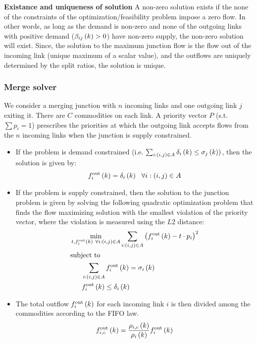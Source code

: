 \textbf{Existance and uniqueness of solution}
A non-zero solution exists if the none of the constraints of the optimization/feasibility problem impose a zero flow. In other words, as long as the demand is non-zero and none of the outgoing links with positive demand ($\aggsplitratio{i}{j}{k} > 0$) have non-zero supply, the non-zero solution will exist. Since, the solution to the maximum junction flow is the flow out of the incoming link (unique maximum of a scalar value), and the outflows are uniquely determined by the split ratios, the solution is unique.
 
\subsubsection{Merge solver} 
\label{sec:mergeSolver}
We consider a merging junction with $n$ incoming links and one outgoing link $j$ exiting it. There are $C$ commodities on each link. A priority vector $P$ (s.t. $\sum p_i = 1$) prescribes the priorities at which the outgoing link accepts flows from the $n$ incoming links when the junction is supply constrained.

\begin{itemize}
\item If the problem is demand constrained (i.e. $\sum_{i:(i,j)\in A} \celldemand{i}{k} \leq{\cellsupply{j}{k}})$, then the solution is given by:
	\begin{align*}
	\flowout{i}{k} = \celldemand{i}{k} \ \ \forall{i:(i,j)\in A}\\
	\end{align*}
\item If the problem is supply constrained, then the solution to the junction problem is given by solving the following quadratic optimization problem that finds the flow maximizing solution with the smallest violation of the priority vector, where the violation is measured using the $L2$ distance:
	\begin{align*}
	&\min_{t,\flowout{i}{k} \ \forall{i:(i,j)\in A}}{\sum_{i:(i,j)\in A}\left(\flowout{i}{k} - t\cdot p_i\right)^2} \\
	&\text{subject to} \\
	&\ \ \ \ \ \sum_{i:(i,j)\in A} \flowout{i}{k} = \cellsupply{i}{k} \\
	&\ \ \ \ \ \flowout{i}{k} \le{\celldemand{i}{k}}
	\end{align*} 

\item The total outflow $\flowout{i}{k}$ for each incoming link $i$ is then divided among the commodities according to the FIFO law.
	\begin{align*}
	\flowoutmc{i}{k}{c} &= \frac{\densitymc{i}{k}{c}}{\density{i}{k}}\flowout{i}{k}\\
	\end{align*} 

\end{itemize}

